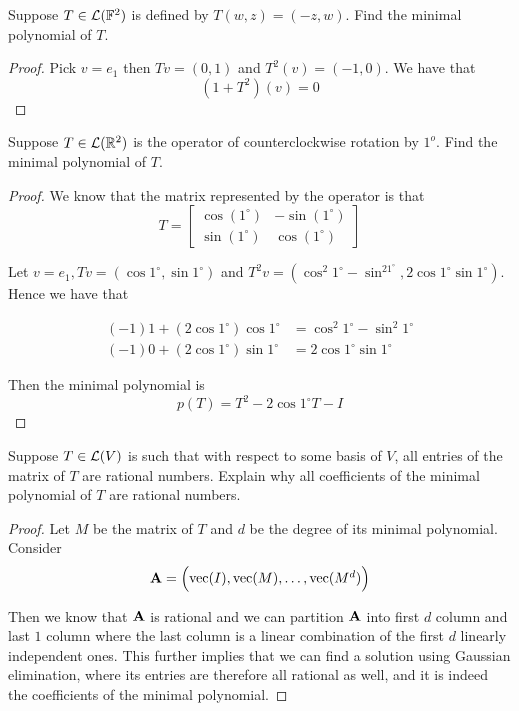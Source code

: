 \documentclass{extarticle}
\begin{document}
\begin{problem}{6}
    Suppose \(T \in \mathcal{L}(\mathbb{F}^2)\) is defined by \(T(w, z) = (-z, w)\). Find the minimal polynomial of \(T\).
\end{problem}

\begin{proof}
Pick \(v = e_1\) then \(Tv = (0, 1)\) and \(T^2(v) = (-1, 0)\). We have that  
\[(1 + T^2)(v) = 0\]
\end{proof}


\begin{problem}{8}
    Suppose \(T \in \mathcal{L}(\mathbb{R}^2)\) is the operator of counterclockwise rotation by \(1^o\). Find the minimal 
    polynomial of \(T\). 
\end{problem}


\begin{proof}
We know that the matrix represented by the operator is that 
\[T = \begin{bmatrix}
    \cos(1^\circ)    &  -\sin(1^\circ) \\ 
    \sin(1^\circ)    &  \cos(1^\circ)
\end{bmatrix}\]

Let \(v = e_1, Tv = (\cos1^\circ, \sin 1^\circ)\) and 
\(T^2v = (\cos^2 1^\circ - \sin^21^\circ, 2\cos 1^\circ \sin 1^\circ)\). Hence we have that 

\begin{align*}
    (-1)1 + (2 \cos 1^\circ)\cos 1^\circ &= \cos^2 1^\circ - \sin^2 1^\circ  \\ 
    (-1)0 + (2 \cos 1^\circ)\sin 1^\circ &= 2 \cos 1^\circ \sin 1^\circ 
\end{align*}

Then the minimal polynomial is 
\[p(T) = T^2 - 2 \cos 1^\circ T - I\]


\end{proof}




\begin{problem}{9}
    Suppose \(T \in \mathcal{L}(V)\) is such that with respect to some basis of \(V\), all entries of the matrix 
    of \(T\) are rational numbers. Explain why all coefficients of the minimal polynomial of 
    \(T\) are rational numbers. 
\end{problem}

\begin{proof}
Let \(M\) be the matrix of \(T\) and \(d\) be the degree of its minimal polynomial. Consider 
\[\mathbf{A} = \begin{pmatrix}
    \text{vec}(I), \text{vec}(M), \ldots, \text{vec}(M^d)
\end{pmatrix}\]

Then we know that \(\mathbf{A}\) is rational and we can partition \(\mathbf{A}\) into first \(d\) column and last \(1\) 
column where the last column is a linear combination of the first \(d\) linearly independent ones. This further 
implies that we can find a solution using Gaussian elimination, where its entries are therefore all rational 
as well, and it is indeed the coefficients of the minimal polynomial. 
\end{proof}
\end{document}
